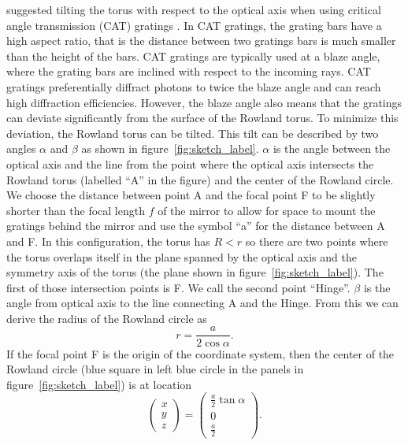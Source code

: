 \documentclass[linenumbers]{aastex631}
\begin{document}
\citet{doi:10.1117/12.856482} suggested tilting the torus with respect to the optical axis when using critical angle transmission (CAT) gratings \citep{2021hai4.book..235H,2022ApJ...934..171H}. In CAT gratings, the grating bars have a high aspect ratio, that is the distance between two gratings bars is much smaller than the height of the bars. CAT gratings are typically used at a blaze angle, where the grating bars are inclined with respect to the incoming rays. CAT gratings preferentially diffract photons to twice the blaze angle and can reach high diffraction efficiencies. However, the blaze angle also means that the gratings can deviate significantly from the surface of the  Rowland torus. To minimize this deviation, the Rowland torus can be tilted.
This tilt can be described by two angles $\alpha$ and $\beta$ as shown in figure~\ref{fig:sketch_label}. $\alpha$ is the angle between the optical axis and the line from the point where the optical axis intersects the Rowland torus (labelled ``A'' in the figure) and the center of the Rowland circle.  We choose the distance between point A and the focal point F to be slightly shorter than the focal length $f$ of the mirror to allow for space to mount the gratings behind the mirror and use the symbol ``a'' for the distance between A and F.
In this configuration, the torus has $R < r$ so there are two points where the torus overlaps itself in the plane spanned by the optical axis and the symmetry axis of the torus (the plane shown in figure~\ref{fig:sketch_label}). The first of those intersection points is F. We call the second point ``Hinge''.
$\beta$ is the angle from optical axis to the line connecting A and the Hinge. From this we can derive the radius of the Rowland circle as
$$r = \frac{a}{2\cos \alpha}.$$
 If the focal point F is the origin of the coordinate system, then the center of the Rowland circle (blue square in left blue circle in the panels in figure~\ref{fig:sketch_label}) is at location
 \begin{equation}
    \begin{pmatrix} x \\ y \\ z \end{pmatrix} =
    \begin{pmatrix} \frac{a}{2} \tan\alpha \\0 \\   \frac{a}{2} \end{pmatrix}.
 \end{equation}
\end{document}
